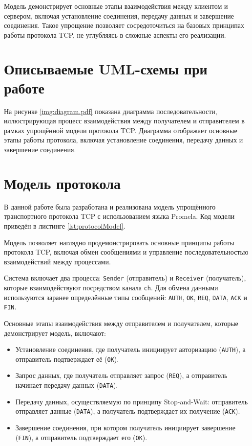 \documentclass{bmstu}
\begin{document}
Модель демонстрирует основные этапы взаимодействия между клиентом и сервером, включая установление соединения, передачу данных и завершение соединения. Такое упрощение позволяет сосредоточиться на базовых принципах работы протокола TCP, не углубляясь в сложные аспекты его реализации.

\section{Описываемые UML-схемы при работе}

На рисунке \ref{img:diagram.pdf} показана диаграмма последовательности, иллюстрирующая процесс взаимодействия между получателем и отправителем в рамках упрощённой модели протокола TCP. Диаграмма отображает основные этапы работы протокола, включая установление соединения, передачу данных и завершение соединения.


\section{Модель протокола}

В данной работе была разработана и реализована модель упрощённого транспортного протокола TCP с использованием языка Promela. Код модели приведён в листинге \ref{lst:protocolModel}.

Модель позволяет наглядно продемонстрировать основные принципы работы протокола TCP, включая обмен сообщениями и управление последовательностью взаимодействий между процессами.

Система включает два процесса: \texttt{Sender} (отправитель) и \texttt{Receiver} (получатель), которые взаимодействуют посредством канала \texttt{ch}. Для обмена данными используются заранее определённые типы сообщений: \texttt{AUTH}, \texttt{OK}, \texttt{REQ}, \texttt{DATA}, \texttt{ACK} и \texttt{FIN}.

Основные этапы взаимодействия между отправителем и получателем, которые демонстрирует модель, включают:

\begin{itemize}
  \item Установление соединения, где получатель инициирует авторизацию (\texttt{AUTH}), а отправитель подтверждает её (\texttt{OK}).
  \item Запрос данных, где получатель отправляет запрос (\texttt{REQ}), а отправитель начинает передачу данных (\texttt{DATA}).
  \item Передачу данных, осуществляемую по принципу Stop-and-Wait: отправитель отправляет данные (\texttt{DATA}), а получатель подтверждает их получение (\texttt{ACK}).
  \item Завершение соединения, при котором получатель инициирует завершение (\texttt{FIN}), а отправитель подтверждает его (\texttt{OK}).
\end{itemize}
\end{document}
